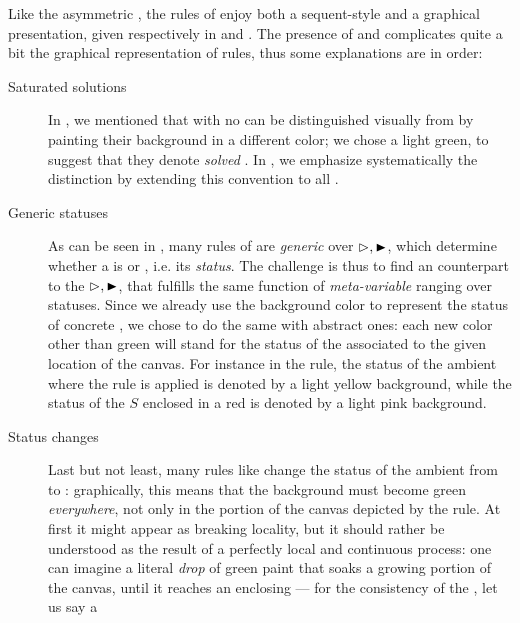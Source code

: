 Like the asymmetric  , the rules of 
enjoy both a sequent-style and a graphical presentation, given respectively in
 and . The presence of  and
  complicates quite a bit the graphical
representation of rules, thus some explanations are in order:
\begin{description}
  \item[Saturated solutions] In , we mentioned that 
 with no   can be distinguished visually from 
 by painting their background in a different color; we chose a light
green, to suggest that they denote \emph{solved} . In
, we emphasize systematically the distinction by extending
this convention to all  .
  \item[Generic statuses] As can be seen in , many rules of
 are \emph{generic} over  $\J, \JB$, which
determine whether a  is  or , i.e. its \emph{status}. The
challenge is thus to find an  counterpart to the  $\J, \JB$, that
fulfills the same function of \emph{meta-variable} ranging over 
statuses. Since we already use the background color to represent the status of
concrete , we chose to do the same with abstract ones: each new color
other than green will stand for the status of the  associated to the
given location of the canvas. For instance in the 
rule, the status of the ambient  where the rule is applied is denoted by
a light yellow background, while the status of the  $S$ enclosed in a
red  is denoted by a light pink background.
  \item[Status changes] Last but not least, many rules like  change
the status of the ambient  from  to :
graphically, this means that the background must become green \emph{everywhere},
not only in the portion of the canvas depicted by the rule. At first it might
appear as breaking locality, but it should rather be understood as the result of
a perfectly local and continuous process: one can imagine a literal \emph{drop}
of green paint that soaks a growing portion of the canvas, until it reaches an
enclosing  --- for the consistency of the , let us say a

\end{description}
